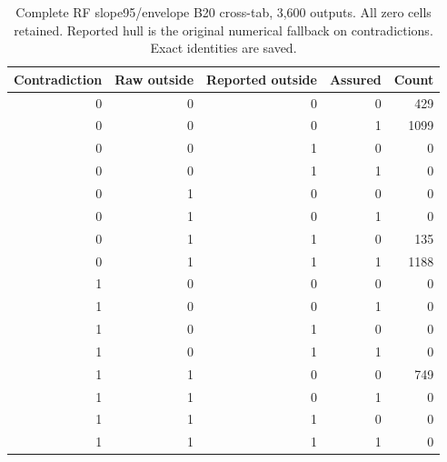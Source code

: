 \begin{table}[H]\centering\small
\caption{Complete RF slope95/envelope B20 cross-tab, 3,600 outputs. All zero cells retained. Reported hull is the original numerical fallback on contradictions. Exact identities are saved.}\label{tab:s_cross}
\setlength{\tabcolsep}{4pt}\begin{tabular}{rrrrr}
\toprule
Contradiction & Raw outside & Reported outside & Assured & Count \\ \midrule
0 & 0 & 0 & 0 & 429 \\
0 & 0 & 0 & 1 & 1099 \\
0 & 0 & 1 & 0 & 0 \\
0 & 0 & 1 & 1 & 0 \\
0 & 1 & 0 & 0 & 0 \\
0 & 1 & 0 & 1 & 0 \\
0 & 1 & 1 & 0 & 135 \\
0 & 1 & 1 & 1 & 1188 \\
1 & 0 & 0 & 0 & 0 \\
1 & 0 & 0 & 1 & 0 \\
1 & 0 & 1 & 0 & 0 \\
1 & 0 & 1 & 1 & 0 \\
1 & 1 & 0 & 0 & 749 \\
1 & 1 & 0 & 1 & 0 \\
1 & 1 & 1 & 0 & 0 \\
1 & 1 & 1 & 1 & 0 \\
\bottomrule\end{tabular}\end{table}
